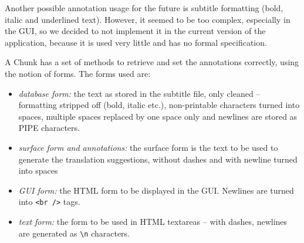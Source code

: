 Another possible annotation usage for the future is subtitle formatting (bold, italic and underlined text).
However, it seemed to be too complex, especially in the GUI, so we decided to not implement it in the current version of the application, because it is used very little and has no formal specification.

A Chunk has a set of methods to retrieve and set the annotations correctly, using the notion of forms. The forms used are:

\begin{itemize}
	\item \emph{database form:} the text as stored in the subtitle file, only cleaned -- formatting stripped off (bold, italic etc.), non-printable characters turned into spaces, multiple spaces replaced by one space only and newlines are stored as PIPE characters.
	\item \emph{surface form and annotations:} the surface form is the text to be used to generate the translation suggestions, without dashes and with newline turned into spaces
	\item \emph{GUI form:} the HTML form to be displayed in the GUI. Newlines are turned into {\tt <br />} tags.
	\item \emph{text form:} the form to be used in HTML textareas -- with dashes, newlines are generated as {\tt \verb#\n#} characters.
\end{itemize}
